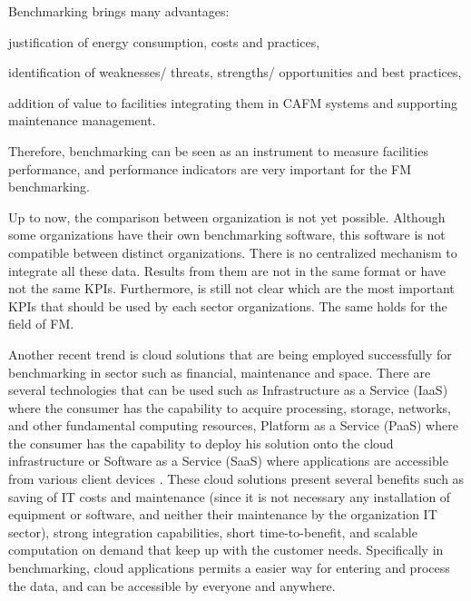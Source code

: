 Benchmarking brings many advantages:
 \begin{enumerate*}[label=\itshape\roman{enumi})]
  	\item justification of energy consumption, costs and practices,
  	\item identification of weaknesses/ threats, strengths/ opportunities and best practices,
  	\item addition of value to facilities integrating them in CAFM systems and supporting maintenance management. 
\end{enumerate*}
Therefore, benchmarking can be seen as an instrument to measure facilities performance, and performance indicators are very important for the FM benchmarking. 

Up to now, the comparison between organization is not yet possible. Although some organizations have their own benchmarking software, this software is not compatible between distinct organizations. There is no centralized mechanism to integrate all these data. Results from them are not in the same format or have not the same KPIs. Furthermore, is still not clear which are the most important KPIs that should be used by each sector organizations. The same holds for the field of FM.

Another recent trend is cloud solutions that are being employed successfully for benchmarking in sector such as financial, maintenance and space. There are several technologies that can be used such as Infrastructure as a Service (IaaS) where the consumer has the capability to acquire processing, storage, networks, and other fundamental computing resources, Platform as a Service (PaaS) where the consumer has the capability to deploy his solution onto the cloud infrastructure or Software as a Service (SaaS) where applications are accessible from various client devices \cite{Lenk2009}. 
These cloud solutions present several benefits such as saving of IT costs and maintenance (since it is not necessary any installation of equipment or software, and neither their maintenance by the organization IT sector), strong integration capabilities, short time-to-benefit, and scalable computation on demand that keep up with the customer needs. Specifically in benchmarking, cloud applications permits a easier way for entering and process the data, and can be accessible by everyone and anywhere. 

